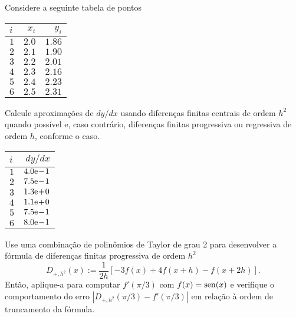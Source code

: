 \begin{exer}\label{cap_deriv_sec_df:exer:df_tab}
  Considere a seguinte tabela de pontos
  \begin{center}
    \begin{tabular}{l|rr}
      $i$ & $x_i$ & $y_i$\\\hline
      $1$ & $2.0$ & $1.86$\\
      $2$ & $2.1$ & $1.90$\\
      $3$ & $2.2$ & $2.01$\\
      $4$ & $2.3$ & $2.16$\\
      $5$ & $2.4$ & $2.23$\\
      $6$ & $2.5$ & $2.31$\\\hline
    \end{tabular}
  \end{center}
Calcule aproximações de $dy/dx$ usando diferenças finitas centrais de ordem $h^2$ quando possível e, caso contrário, diferenças finitas progressiva ou regressiva de ordem $h$, conforme o caso.
\end{exer}
\begin{resp}
  \begin{center}
    \begin{tabular}{l|r}\toprule
      $i$ & $dy/dx$\\\midrule
      $1$ & $4.0\mathrm{e}\!-\!1$\\
      $2$ & $7.5\mathrm{e}\!-\!1$\\
      $3$ & $1.3\mathrm{e}\!+\!0$\\
      $4$ & $1.1\mathrm{e}\!+\!0$\\
      $5$ & $7.5\mathrm{e}\!-\!1$\\
      $6$ & $8.0\mathrm{e}\!-\!1$\\\bottomrule
    \end{tabular}
  \end{center}
\end{resp}

\begin{exer}
  Use uma combinação de polinômios de Taylor de grau 2 para desenvolver a fórmula de diferenças finitas progressiva de ordem $h^2$
  \begin{equation}\label{cap_deriv_sec_df:eq:dfp_h2}
    D_{+,h^2}(x) := \frac{1}{2h}\left[-3f(x) + 4f(x+h) - f(x+2h)\right].
  \end{equation}
  Então, aplique-a para computar $f'(\pi/3)$ com $f(x)=\operatorname{sen}(x)$ e verifique o comportamento do erro $|D_{+,h^2}(\pi/3) - f'(\pi/3)|$ em relação à ordem de truncamento da fórmula.
\end{exer}

